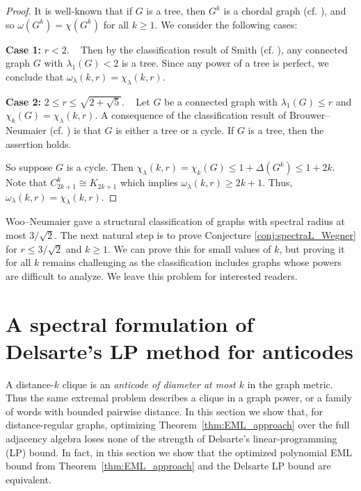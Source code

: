 \documentclass[11pt]{article}
\theoremstyle{plain}
\numberwithin{equation}{section}
\begin{document}
\begin{proof}  It is well-known that if $G$ is a tree, then $G^k$ is a chordal graph (cf. \cite{Agnarsson_Halldorsson_2007}), and so $\omega(G^k) = \chi(G^k)$ for all $k\ge 1$. We consider the following cases:

\textbf{Case 1:} $r < 2$. ~ Then by the classification result of Smith \cite{Smith_1970} (cf. \cite[Theorem 3.1.3]{Brouwer_Haemers_2012}), any connected graph $G$ with $\lambda_1(G)<2$ is a tree. Since any power of a tree is perfect, we conclude that $\omega_\lambda(k,r) = \chi_\lambda(k,r)$.

\textbf{Case 2:} $2\le r\le \sqrt{2+\sqrt{5}}$. ~ Let $G$ be a connected graph with $\lambda_1(G)\le r$ and $\chi_k(G) = \chi_\lambda(k,r)$. A consequence of the classification result of Brouwer--Neumaier \cite{Brouwer_Neumaier_1989} (cf. \cite{Cvetkovic_Doob_Gutman_1982}) is that $G$ is either a tree or a cycle. If $G$ is a tree, then the assertion holds. 

So suppose $G$ is a cycle. Then $\chi_\lambda(k,r) =\chi_k(G)\le 1 + \Delta(G^k) \le 1 + 2k$. Note that $C_{2k+1}^k \cong K_{2k+1}$ which implies $\omega_\lambda(k,r)\ge 2k+1$. Thus, $\omega_\lambda(k,r) = \chi_\lambda(k,r)$. 
\end{proof}

Woo--Neumaier \cite{Woo_Neumaier_2007} gave a structural classification of graphs with spectral radius at most $3/\sqrt{2}$. The next natural step is to prove Conjecture \ref{conj:spectraL_Wegner} for $r\le 3/\sqrt{2}$ and $k\ge 1$. We can prove this for small values of $k$, but proving it for all $k$ remains challenging as the classification includes graphs whose powers are difficult to analyze. We leave this problem for interested readers. 

\section{A spectral formulation of Delsarte's LP method for anticodes}\label{sec:coding} 
A distance-$k$ clique is an \emph{anticode of diameter at most $k$} in the graph metric. Thus the same extremal problem describes a clique in a graph power, or a family of words with bounded pairwise distance. In this section we show that, for distance-regular graphs, optimizing Theorem~\ref{thm:EML_approach} over the full adjacency algebra loses none of the strength of Delsarte's linear-programming (LP) bound. In fact, in this section we show that the optimized polynomial EML bound from Theorem~\ref{thm:EML_approach} and the Delsarte LP bound are equivalent.
\end{document}
